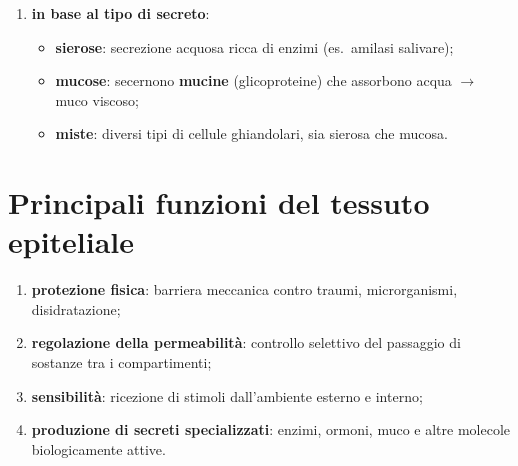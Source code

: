 \begin{enumerate}[label=\Alph*)]
\begin{itemize}
      \item \textbf{olocrine}: le cellule accumulano fino a ``scoppiare'', rilasciando l'intero
        citoplasma; rimpiazzate per mitosi delle staminali basali (es.\ gh.\ sebacee);
    \end{itemize}
  \item \textbf{in base al tipo di secreto}:
    \begin{itemize}
      \item \textbf{sierose}: secrezione acquosa ricca di enzimi (es.\ amilasi salivare);
      \item \textbf{mucose}: secernono \textbf{mucine} (glicoproteine) che assorbono acqua
        $\rightarrow$ muco viscoso;
      \item \textbf{miste}: diversi tipi di cellule ghiandolari, sia sierosa che mucosa.
    \end{itemize}
\end{enumerate}

\section{Principali funzioni del tessuto epiteliale}
\begin{enumerate}
  \item \textbf{protezione fisica}: barriera meccanica contro traumi, microrganismi, disidratazione;
  \item \textbf{regolazione della permeabilità}: controllo selettivo del passaggio di sostanze tra
    i compartimenti;
  \item \textbf{sensibilità}: ricezione di stimoli dall'ambiente esterno e interno;
  \item \textbf{produzione di secreti specializzati}: enzimi, ormoni, muco e altre molecole
    biologicamente attive.
\end{enumerate}
